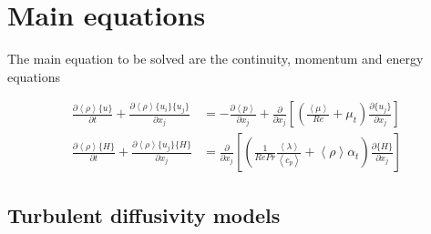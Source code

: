 \documentclass[paper=a4, fontsize=12pt]{scrartcl} %
\newcommand{\rave}[1]{\left<{#1}\right>}
\newcommand{\fave}[1]{\{{#1}\}}
\newcommand{\fpd}[2]{\frac{\partial #1}{\partial {#2}}}
\begin{document}
\section{Main equations}

The main equation to be solved are the continuity, momentum and energy equations

\begin{equation}
\begin{split}
\fpd{\rave{\rho}\fave{u}}{t} + \fpd{\rave{\rho}\fave{u_i}\fave{u_j}}{x_j} &= -\fpd{\rave{p}}{x_j}+\fpd{}{x_j}\left[\left(\frac{\rave{\mu}}{Re}+\mu_t\right)\fpd{\fave{u_j}}{x_j}\right] \\
\fpd{\rave{\rho}\fave{H}}{t} + \fpd{\rave{\rho}\fave{u_j}\fave{H}}{x_j} &= \fpd{}{x_j}\left[\left(\frac{1}{Re Pr}\frac{\rave{\lambda}}{\rave{c_p}}+\rave{\rho}\alpha_t\right)\fpd{\fave{H}}{x_j}\right]
\end{split}
\end{equation}


\newpage




\newpage


\newpage
\subsection{Turbulent diffusivity models}


\newpage
{}

\end{document}
